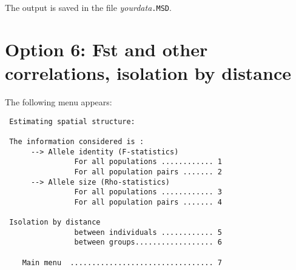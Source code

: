 \documentclass[
  12pt,
]{book}
\begin{document}
The output is saved in the file \emph{yourdata}\texttt{.MSD}.

\hypertarget{option-6-fst-and-other-correlations-isolation-by-distance}{%
\section{Option 6: Fst and other correlations, isolation by distance}\label{option-6-fst-and-other-correlations-isolation-by-distance}}

The following menu appears:

\begin{verbatim}
 Estimating spatial structure:

 The information considered is :
      --> Allele identity (F-statistics)
                For all populations ............ 1
                For all population pairs ....... 2
      --> Allele size (Rho-statistics)
                For all populations ............ 3
                For all population pairs ....... 4

 Isolation by distance
                between individuals ............ 5
                between groups.................. 6

    Main menu  ................................. 7
\end{verbatim}
\end{document}
